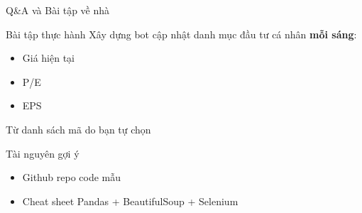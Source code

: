 \documentclass[10pt]{beamer}
\begin{document}
\begin{frame}{Q\&A và Bài tập về nhà}
  \begin{block}{Bài tập thực hành}
    Xây dựng bot cập nhật danh mục đầu tư cá nhân \textbf{mỗi sáng}:
    \begin{itemize}
      \item Giá hiện tại
      \item P/E
      \item EPS
    \end{itemize}
    Từ danh sách mã do bạn tự chọn
  \end{block}

  \vspace{1em}
  \begin{block}{Tài nguyên gợi ý}
    \begin{itemize}
      \item Github repo code mẫu
      \item Cheat sheet Pandas + BeautifulSoup + Selenium
    \end{itemize}
  \end{block}
\end{frame}
\end{document}
